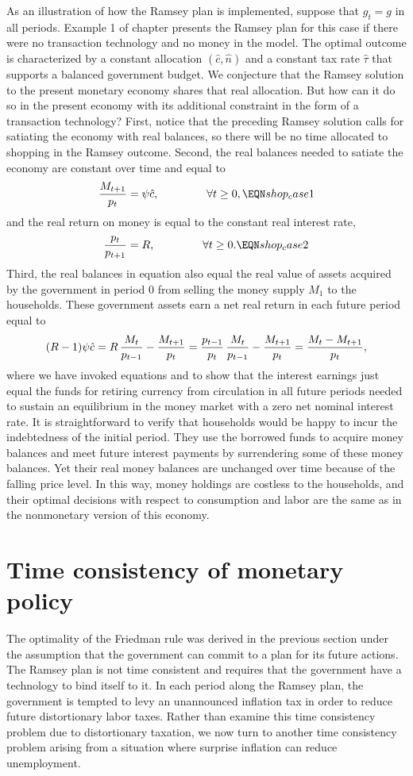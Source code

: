 As an illustration of how the Ramsey plan is implemented, suppose that
$g_t=g$ in all periods. Example 1 of chapter  presents the Ramsey
plan for this case if there were no transaction technology and no money
in the model. The optimal outcome is characterized by a constant allocation
$(\hat c, \hat n)$ and a constant tax rate $\hat \tau$ that
supports a balanced government budget. We conjecture that the Ramsey
solution to the present monetary economy shares that real
allocation. But how can it do so in the present economy with its
additional constraint in the form of a transaction technology? First, notice
that the preceding Ramsey solution calls for satiating the economy
with real balances, so there will be no time allocated to shopping in
the Ramsey outcome. Second, the real balances needed to satiate the
economy are constant over time and equal to
$$
{M_{t+1} \over p_t} = \psi \hat c,  \hskip1.5cm \forall t \geq 0,  \EQN shop_case1
$$
and the real return on money is equal to the constant real interest rate,
$$
{ p_t \over p_{t+1} } = R,         \hskip1.5cm \forall t \geq 0.  \EQN shop_case2
$$
Third, the real balances in equation  also equal the
real value of assets acquired by the government in period $0$ from
selling the money supply $M_1$ to the households. These government
assets earn a net real return in each future period equal to
$$
(R-1) \psi \hat c = R \,{M_{t} \over p_{t-1} } - {M_{t+1} \over p_t}
= {p_{t-1} \over p_t } \,{M_{t} \over p_{t-1} } - {M_{t+1} \over p_t}
= {M_{t} - M_{t+1} \over p_t},
$$
where we have invoked equations  and 
to show that the interest earnings just equal the funds for retiring
currency from circulation in all future periods needed
 to sustain an equilibrium
in the money market with a zero net nominal interest rate.
It is straightforward to verify that households
would be happy to incur the indebtedness of the initial period. They
use the borrowed funds to acquire money balances and meet
future interest payments by surrendering some of these money balances.
Yet  their real money balances are unchanged over time because of the
falling price level. In this way, money holdings are costless to the
households, and their optimal decisions with respect to consumption
and labor are the same as in the nonmonetary version of this economy.


\section{Time consistency of monetary policy}
The optimality of the Friedman rule was derived in the previous
section under the assumption that the government can commit to a
plan for its future actions. The Ramsey plan is not time
consistent and requires that the government have a technology to
bind itself to it. In each period along the Ramsey plan, the
government is tempted to levy an unannounced inflation tax in
order to reduce future distortionary labor taxes. Rather than
examine this time consistency problem due to distortionary
taxation, we now turn to another time consistency problem arising
from a situation where surprise inflation can reduce unemployment.



